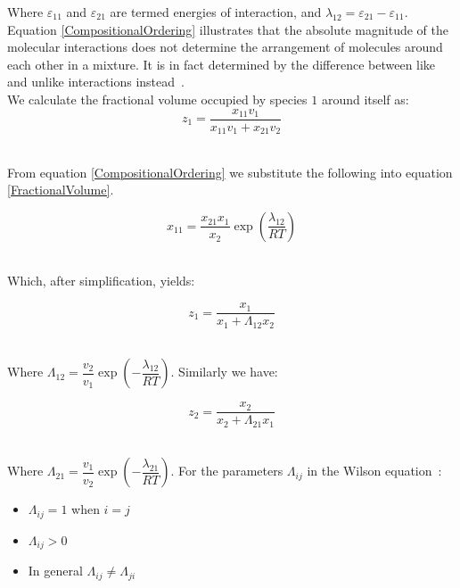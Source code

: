 
Where $\varepsilon_{11}$ and $\varepsilon_{21}$ are termed energies of interaction, and $\lambda_{12} = \varepsilon_{21} -\varepsilon_{11}$. Equation \ref{CompositionalOrdering} illustrates that the absolute magnitude of the molecular interactions does not determine the arrangement of molecules around each other in a mixture. It is in fact determined by the difference between like and unlike interactions instead~\cite{ThermophysicalProperties}.\\

We calculate the fractional volume occupied by species $1$ around itself as:\
\begin{equation}
z_{1}  =\frac{x_{11}v_{1}}{x_{11}v_{1}+x_{21}v_{2}} \label{FractionalVolume}
\end{equation}\

From equation \ref{CompositionalOrdering} we substitute the following into equation \ref{FractionalVolume}.\

\begin{equation}
x_{11} = \dfrac{x_{21}x_{1}}{x_{2}} \exp\left(\dfrac{\lambda_{12}}{RT}\right)
\end{equation}\

Which, after simplification, yields:\

\begin{equation}
z_{1} = \frac{x_{1}}{x_{1} + \Lambda_{12}x_{2}} \label{z1}
\end{equation}\

Where $\Lambda_{12} = \dfrac{v_{2}}{v_{1}}\exp\left(-\dfrac{\lambda_{12}}{RT}\right)$. Similarly we have:\

\begin{equation}
z_{2} = \frac{x_{2}}{x_{2} + \Lambda_{21}x_{1}} \label{z2}
\end{equation}\

Where $\Lambda_{21} = \dfrac{v_{1}}{v_{2}}\exp\left(-\dfrac{\lambda_{21}}{RT}\right)$. For the parameters $\Lambda_{ij}$ in the Wilson equation~\cite{ThermophysicalProperties}:\
\begin{itemize}
\item $\Lambda_{ij} = 1$ when $i=j$\
\item $\Lambda_{ij} > 0 $\
\item In general $\Lambda_{ij} \neq \Lambda_{ji}$\
\end{itemize}

